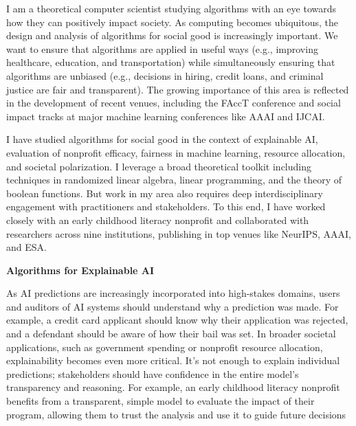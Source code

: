 \documentclass[11pt]{article}
\begin{document}
{\setlength{\parindent}{0cm}
I am a theoretical computer scientist studying algorithms with an eye towards how they can positively impact society. As computing becomes ubiquitous, the design and analysis of algorithms for social good is increasingly important. We want to ensure that algorithms are applied in useful ways (e.g., improving healthcare, education, and transportation) while simultaneously ensuring that algorithms are unbiased (e.g., decisions in hiring, credit loans, and criminal justice are fair and transparent). The growing importance of this area is reflected in the development of recent venues, including the FAccT conference and social impact tracks at major machine learning conferences like AAAI and IJCAI.

I have studied algorithms for social good in the context of explainable AI, evaluation of nonprofit efficacy, fairness in machine learning, resource allocation, and societal polarization. I leverage a broad theoretical toolkit including techniques in randomized linear algebra, linear programming, and the theory of boolean functions. But work in my area also requires deep interdisciplinary engagement with practitioners and stakeholders. To this end, I have worked closely with an early childhood literacy nonprofit and collaborated with researchers across nine institutions, publishing in top venues like NeurIPS, AAAI, and ESA.

\begin{center}
{\large \textbf{Algorithms for Explainable AI}}
\end{center}

As AI predictions are increasingly incorporated into high-stakes domains, users and auditors of AI systems should understand why a prediction was made. For example, a credit card applicant should know why their application was rejected, and a defendant should be aware of how their bail was set. In broader societal applications, such as government spending or nonprofit resource allocation, explainability becomes even more critical. It’s not enough to explain individual predictions; stakeholders should have confidence in the entire model’s transparency and reasoning. For example, an early childhood literacy nonprofit benefits from a transparent, simple model to evaluate the impact of their program, allowing them to trust the analysis and use it to guide future decisions

}
\end{document}
